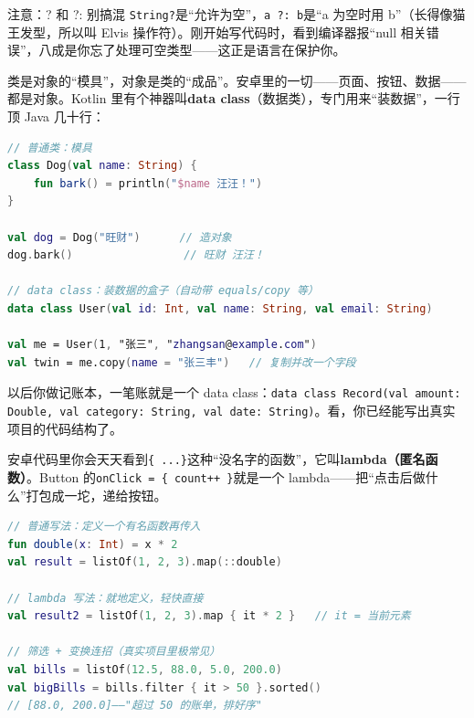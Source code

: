 \begin{tcbwarn}{注意：? 和 ?: 别搞混}
\texttt{String?}是“允许为空”，\texttt{a ?: b}是“a 为空时用 b”（长得像猫王发型，所以叫 Elvis 操作符）。刚开始写代码时，看到编译器报“null 相关错误”，八成是你忘了处理可空类型——这正是语言在保护你。

\end{tcbwarn}


类是对象的“模具”，对象是类的“成品”。安卓里的一切——页面、按钮、数据——都是对象。Kotlin 里有个神器叫\textbf{data class}（数据类），专门用来“装数据”，一行顶 Java 几十行：

\begin{lstlisting}[language=Kotlin]
// 普通类：模具
class Dog(val name: String) {
    fun bark() = println("$name 汪汪！")
}

val dog = Dog("旺财")      // 造对象
dog.bark()                 // 旺财 汪汪！

// data class：装数据的盒子（自动带 equals/copy 等）
data class User(val id: Int, val name: String, val email: String)

val me = User(1, "张三", "zhangsan@example.com")
val twin = me.copy(name = "张三丰")   // 复制并改一个字段
\end{lstlisting}

以后你做记账本，一笔账就是一个 data class：\texttt{data class Record(val amount: Double, val category: String, val date: String)}。看，你已经能写出真实项目的代码结构了。


安卓代码里你会天天看到\texttt{\{ .\allowbreak .\allowbreak .\allowbreak  \}}这种“没名字的函数”，它叫\textbf{lambda（匿名函数）}。Button 的\texttt{onClick = \{ count++ \}}就是一个 lambda——把“点击后做什么”打包成一坨，递给按钮。

\begin{lstlisting}[language=Kotlin]
// 普通写法：定义一个有名函数再传入
fun double(x: Int) = x * 2
val result = listOf(1, 2, 3).map(::double)

// lambda 写法：就地定义，轻快直接
val result2 = listOf(1, 2, 3).map { it * 2 }   // it = 当前元素

// 筛选 + 变换连招（真实项目里极常见）
val bills = listOf(12.5, 88.0, 5.0, 200.0)
val bigBills = bills.filter { it > 50 }.sorted()
// [88.0, 200.0]——"超过 50 的账单，排好序"
\end{lstlisting}

